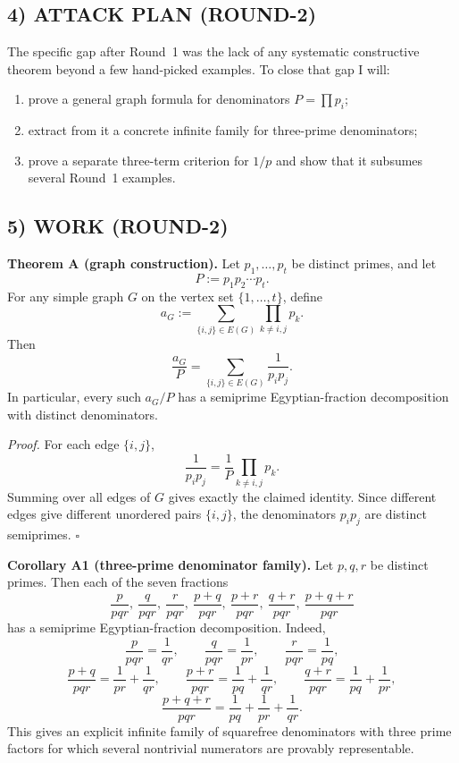 \subsection*{4) ATTACK PLAN (ROUND-2)}
The specific gap after Round~1 was the lack of any systematic constructive theorem beyond a few hand-picked examples.
To close that gap I will:
\begin{enumerate}
\item prove a general graph formula for denominators \(P=\prod p_i\);
\item extract from it a concrete infinite family for three-prime denominators;
\item prove a separate three-term criterion for \(1/p\) and show that it subsumes several Round~1 examples.
\end{enumerate}

\subsection*{5) WORK (ROUND-2)}
\textbf{Theorem A (graph construction).}
Let \(p_1,\dots,p_t\) be distinct primes, and let
\[
  P:=p_1p_2\cdots p_t.
\]
For any simple graph \(G\) on the vertex set \(\{1,\dots,t\}\), define
\[
  a_G:=\sum_{\{i,j\}\in E(G)} \prod_{k\ne i,j} p_k.
\]
Then
\[
  \frac{a_G}{P}=\sum_{\{i,j\}\in E(G)} \frac{1}{p_i p_j}.
\]
In particular, every such \(a_G/P\) has a semiprime Egyptian-fraction decomposition with distinct denominators.

\medskip
\textit{Proof.}
For each edge \(\{i,j\}\),
\[
  \frac{1}{p_i p_j}=\frac{1}{P}\prod_{k\ne i,j} p_k.
\]
Summing over all edges of \(G\) gives exactly the claimed identity.
Since different edges give different unordered pairs \(\{i,j\}\), the denominators \(p_i p_j\) are distinct semiprimes.
\hfill \(\square\)

\medskip
\textbf{Corollary A1 (three-prime denominator family).}
Let \(p,q,r\) be distinct primes.
Then each of the seven fractions
\[
  \frac{p}{pqr},\ \frac{q}{pqr},\ \frac{r}{pqr},\ \frac{p+q}{pqr},\ \frac{p+r}{pqr},\ \frac{q+r}{pqr},\ \frac{p+q+r}{pqr}
\]
has a semiprime Egyptian-fraction decomposition.
Indeed,
\[
  \frac{p}{pqr}=\frac1{qr},
  \qquad
  \frac{q}{pqr}=\frac1{pr},
  \qquad
  \frac{r}{pqr}=\frac1{pq},
\]
\[
  \frac{p+q}{pqr}=\frac1{pr}+\frac1{qr},
  \qquad
  \frac{p+r}{pqr}=\frac1{pq}+\frac1{qr},
  \qquad
  \frac{q+r}{pqr}=\frac1{pq}+\frac1{pr},
\]
\[
  \frac{p+q+r}{pqr}=\frac1{pq}+\frac1{pr}+\frac1{qr}.
\]
This gives an explicit infinite family of squarefree denominators with three prime factors for which several nontrivial numerators are provably representable.

